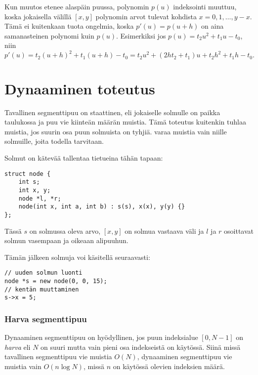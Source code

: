 Kun muutos etenee alaspäin puussa,
polynomin $p(u)$ indeksointi muuttuu,
koska jokaisella välillä $[x,y]$
polynomin arvot tulevat kohdista $x=0,1,\ldots,y-x$.
Tämä ei kuitenkaan tuota ongelmia,
koska $p'(u)=p(u+h)$ on aina
samanasteinen polynomi kuin $p(u)$.
Esimerkiksi jos $p(u)=t_2 u^2+t_1 u-t_0$, niin
\[p'(u)=t_2(u+h)^2+t_1(u+h)-t_0=t_2 u^2 + (2ht_2+t_1)u+t_2h^2+t_1h-t_0.\]

\section{Dynaaminen toteutus}


Tavallinen segmenttipuu on staattinen,
eli jokaiselle solmulle on paikka taulukossa
ja puu vie kiinteän määrän muistia.
Tämä toteutus kuitenkin tuhlaa muistia,
jos suurin osa puun solmuista on tyhjiä.
 varaa muistia vain
niille solmuille, joita todella tarvitaan.

Solmut on kätevää tallentaa tietueina tähän tapaan:

\begin{lstlisting}
struct node {
    int s;
    int x, y;
    node *l, *r;
    node(int x, int a, int b) : s(s), x(x), y(y) {}
};
\end{lstlisting}
Tässä $s$ on solmussa oleva arvo,
$[x,y]$ on solmua vastaava väli
ja $l$ ja $r$ osoittavat
solmun vasempaan ja oikeaan alipuuhun.

Tämän jälkeen solmuja voi käsitellä seuraavasti:

\begin{lstlisting}
// uuden solmun luonti
node *s = new node(0, 0, 15);
// kentän muuttaminen
s->x = 5;
\end{lstlisting}

\subsubsection{Harva segmenttipuu}


Dynaaminen segmenttipuu on hyödyllinen,
jos puun indeksialue $[0,N-1]$ on \textit{harva}
eli $N$ on suuri mutta vain
pieni osa indekseistä on käytössä.
Siinä missä tavallinen segmenttipuu 
vie muistia $O(N)$,
dynaaminen segmenttipuu vie muistia
vain $O(n \log N)$, missä $n$ on
käytössä olevien indeksien määrä.

